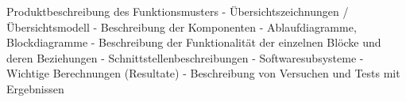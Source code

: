 \documentclass[../../main.tex]{subfiles}
\begin{document}
Produktbeschreibung des Funktionsmusters
- Übersichtszeichnungen / Übersichtsmodell
- Beschreibung der Komponenten
- Ablaufdiagramme, Blockdiagramme
- Beschreibung der Funktionalität der einzelnen Blöcke und deren Beziehungen
- Schnittstellenbeschreibungen
- Softwaresubsysteme
- Wichtige Berechnungen (Resultate)
- Beschreibung von Versuchen und Tests mit Ergebnissen 
\end{document}
